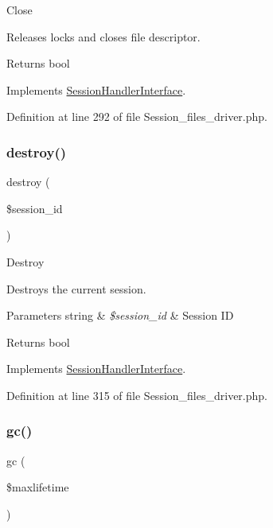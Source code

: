 Close

Releases locks and closes file descriptor.

\begin{DoxyReturn}{Returns}
bool 
\end{DoxyReturn}


Implements \mbox{\hyperlink{interface_session_handler_interface_aa69c8bf1f1dcf4e72552efff1fe3e87e}{Session\+Handler\+Interface}}.



Definition at line 292 of file Session\+\_\+files\+\_\+driver.\+php.

\mbox{\label{class_c_i___session__files__driver_aaec5812f6b4eb6835f88d3baa06a002a}} 
\subsubsection{\texorpdfstring{destroy()}{destroy()}}
{\footnotesize\ttfamily destroy (\begin{DoxyParamCaption}\item[{}]{\$session\+\_\+id }\end{DoxyParamCaption})}

Destroy

Destroys the current session.


\begin{DoxyParams}[1]{Parameters}
string & {\em \$session\+\_\+id} & Session ID \\
\hline
\end{DoxyParams}
\begin{DoxyReturn}{Returns}
bool 
\end{DoxyReturn}


Implements \mbox{\hyperlink{interface_session_handler_interface_aaec5812f6b4eb6835f88d3baa06a002a}{Session\+Handler\+Interface}}.



Definition at line 315 of file Session\+\_\+files\+\_\+driver.\+php.

\mbox{\label{class_c_i___session__files__driver_a57aff7ee0656d8aa75d545fb8b3ae35d}} 
\subsubsection{\texorpdfstring{gc()}{gc()}}
{\footnotesize\ttfamily gc (\begin{DoxyParamCaption}\item[{}]{\$maxlifetime }\end{DoxyParamCaption})}

